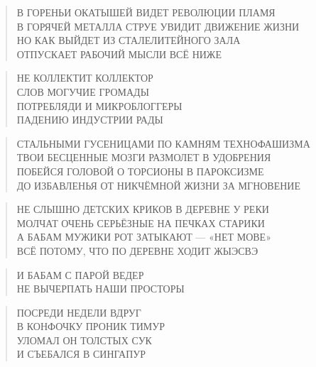 \poemtitle{***}
\begin{verse}
В ГОРЕНЬИ ОКАТЫШЕЙ ВИДЕТ РЕВОЛЮЦИИ ПЛАМЯ\\
В ГОРЯЧЕЙ МЕТАЛЛА СТРУЕ УВИДИТ ДВИЖЕНИЕ ЖИЗНИ\\
НО КАК ВЫЙДЕТ ИЗ СТАЛЕЛИТЕЙНОГО ЗАЛА\\
ОТПУСКАЕТ РАБОЧИЙ МЫСЛИ ВСЁ НИЖЕ
\end{verse}

\poemtitle{***}
\begin{verse}
НЕ КОЛЛЕКТИТ КОЛЛЕКТОР\\
СЛОВ МОГУЧИЕ ГРОМАДЫ\\
ПОТРЕБЛЯДИ И МИКРОБЛОГГЕРЫ\\
ПАДЕНИЮ ИНДУСТРИИ РАДЫ
\end{verse}

\poemtitle{***}
\begin{verse}
СТАЛЬНЫМИ ГУСЕНИЦАМИ ПО КАМНЯМ ТЕХНОФАШИЗМА \\
ТВОИ БЕСЦЕННЫЕ МОЗГИ РАЗМОЛЕТ В УДОБРЕНИЯ\\
ПОБЕЙСЯ ГОЛОВОЙ О ТОРСИОНЫ В ПАРОКСИЗМЕ\\
ДО ИЗБАВЛЕНЬЯ ОТ НИКЧЁМНОЙ ЖИЗНИ ЗА МГНОВЕНИЕ
\end{verse}

\poemtitle{***}
\begin{verse}
НЕ СЛЫШНО ДЕТСКИХ КРИКОВ В ДЕРЕВНЕ У РЕКИ\\
МОЛЧАТ ОЧЕНЬ СЕРЬЁЗНЫЕ НА ПЕЧКАХ СТАРИКИ\\
А БАБАМ МУЖИКИ  РОТ ЗАТЫКАЮТ — «НЕТ МОВЕ»\\
ВСЁ ПОТОМУ, ЧТО ПО ДЕРЕВНЕ ХОДИТ ЖЫЭСВЭ
\end{verse}

\poemtitle{***}
\begin{verse}
И БАБАМ С ПАРОЙ ВЕДЕР\\
НЕ ВЫЧЕРПАТЬ НАШИ ПРОСТОРЫ
\end{verse}

\poemtitle{***}
\begin{verse}
ПОСРЕДИ НЕДЕЛИ ВДРУГ\\
В КОНФОЧКУ ПРОНИК ТИМУР\\
УЛОМАЛ ОН ТОЛСТЫХ СУК\\
И СЪЕБАЛСЯ В СИНГАПУР
\end{verse}

